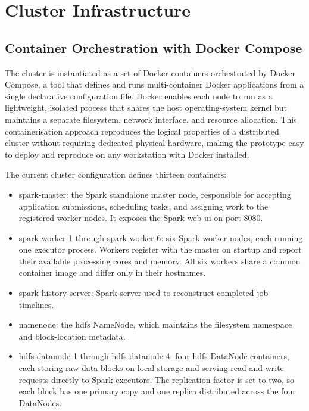 \section{Cluster Infrastructure}
\label{sec:cluster-infra}

\subsection{Container Orchestration with Docker Compose}
\label{subsec:cap4-container-orchestration-with-docker-compose}

The cluster is instantiated as a set of Docker containers \parencite{merkel2014docker} orchestrated
by Docker Compose, a tool that defines and runs multi-container Docker applications from a single
declarative configuration file. Docker enables each node to run as a lightweight, isolated process
that shares the host operating-system kernel but maintains a separate filesystem, network interface,
and resource allocation. This containerisation approach reproduces the logical properties of a
distributed cluster without requiring dedicated physical hardware, making the prototype easy to
deploy and reproduce on any workstation with Docker installed.

The current cluster configuration defines thirteen containers:

\begin{itemize}
      \item spark-master: the Spark standalone master node, responsible for accepting
            application submissions, scheduling tasks, and assigning work to the registered worker
            nodes. It exposes the Spark web \gls{ui} on port 8080.
      \item spark-worker-1 through spark-worker-6: six Spark worker nodes, each
            running one executor process. Workers register with the master on startup and report their
            available processing cores and memory. All six workers share a common container image and
            differ only in their hostnames.
      \item spark-history-server: Spark server used to reconstruct completed job timelines.
      \item namenode: the \gls{hdfs} NameNode, which maintains the filesystem namespace and
            block-location metadata.
      \item hdfs-datanode-1 through hdfs-datanode-4: four \gls{hdfs} DataNode
            containers, each storing raw data blocks on local storage and serving read and write
            requests directly to Spark executors.  The replication factor is set to two, so each
            block has one primary copy and one replica distributed across the four DataNodes.
\end{itemize}

